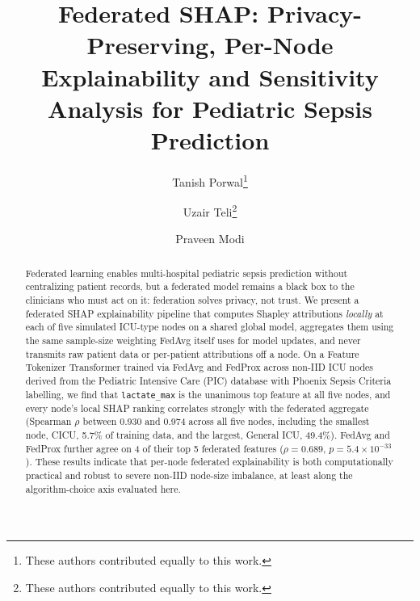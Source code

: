 \documentclass[runningheads]{llncs}
\begin{document}
\title{Federated SHAP: Privacy-Preserving, Per-Node Explainability and Sensitivity Analysis for Pediatric Sepsis Prediction}


\author{Tanish Porwal\thanks{These authors contributed equally to this work.} \and
Uzair Teli\fnmsep\thanks{These authors contributed equally to this work.} \and
Praveen Modi}



\maketitle

\begin{abstract}
Federated learning enables multi-hospital pediatric sepsis prediction without centralizing patient records, but a federated model remains a black box to the clinicians who must act on it: federation solves privacy, not trust. We present a federated SHAP explainability pipeline that computes Shapley attributions \emph{locally} at each of five simulated ICU-type nodes on a shared global model, aggregates them using the same sample-size weighting FedAvg itself uses for model updates, and never transmits raw patient data or per-patient attributions off a node. On a Feature Tokenizer Transformer trained via FedAvg and FedProx across non-IID ICU nodes derived from the Pediatric Intensive Care (PIC) database with Phoenix Sepsis Criteria labelling, we find that \texttt{lactate\_max} is the unanimous top feature at all five nodes, and every node's local SHAP ranking correlates strongly with the federated aggregate (Spearman $\rho$ between 0.930 and 0.974 across all five nodes, including the smallest node, CICU, 5.7\% of training data, and the largest, General ICU, 49.4\%). FedAvg and FedProx further agree on 4 of their top 5 federated features ($\rho = 0.689$, $p = 5.4\times10^{-33}$). These results indicate that per-node federated explainability is both computationally practical and robust to severe non-IID node-size imbalance, at least along the algorithm-choice axis evaluated here.
\end{abstract}
\end{document}
